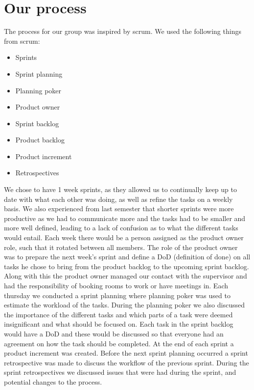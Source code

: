 \section{Our process}
The process for our group was inspired by scrum. We used the following things from scrum:

\begin{itemize}
    \item Sprints 
    \item Sprint planning 
    \item Planning poker 
    \item Product owner 
    \item Sprint backlog 
    \item Product backlog   
    \item Product increment 
    \item Retrospectives 
\end{itemize}

\noindent
We chose to have 1 week sprints, as they allowed us to continually keep up to date with what each other was doing, as well as refine the tasks on a weekly basis.
We also experienced from last semester that shorter sprints were more productive as we had to communicate more and the tasks had to be smaller and more well defined, leading to a lack of confusion as to what the different tasks would entail. 
Each week there would be a person assigned as the product owner role, such that it rotated between all members.
The role of the product owner was to prepare the next week's sprint and define a DoD (definition of done) on all tasks he chose to bring from the product backlog to the upcoming sprint backlog.
Along with this the product owner managed our contact with the supervisor and had the responsibility of booking rooms to work or have meetings in.
Each thursday we conducted a sprint planning where planning poker was used to estimate the workload of the tasks.
During the planning poker we also discussed the importance of the different tasks and which parts of a task were deemed insignificant and what should be focused on.
Each task in the sprint backlog would have a DoD and these would be discussed so that everyone had an agreement on how the task should be completed.
At the end of each sprint a product increment was created. 
Before the next sprint planning occurred a sprint retrospective was made to discuss the workflow of the previous sprint.
During the sprint retrospectives we discussed issues that were had during the sprint, and potential changes to the process.
